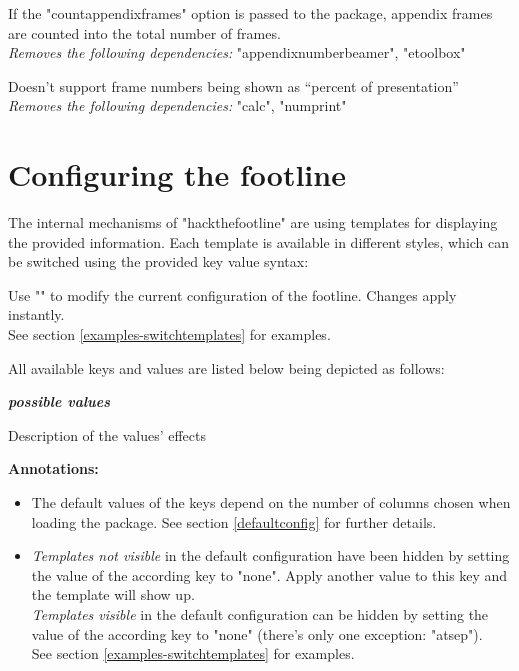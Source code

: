 \documentclass[11pt]{ltxdoc}
\newcommand{\DescribeOption}[3]{
  \DescribeMacro{#1}
  \begin{minipage}[t]{\textwidth}
    \textit{\textbf{#2}}\dotfill~\par
    \begingroup
    \vspace{0.5em}#3\par
    \endgroup
  \end{minipage}%
  \bigskip\medskip%
}
\begin{document}
	\medskip
	If the "countappendixframes" option is passed to the package, appendix frames are counted into the total number of frames. \\
	\textit{Removes the following dependencies:} "appendixnumberbeamer", "etoolbox"
	
	\medskip
	Doesn't support frame numbers being shown as \enquote{percent of presentation} \\
	\textit{Removes the following dependencies:} "calc", "numprint"



	\section{Configuring the footline}
	The internal mechanisms of "hackthefootline" are using templates for displaying the provided information.
	Each template is available in different styles, which can be switched using the provided key value syntax:
	
	\medskip
	\DescribeMacro{\htfconfig}
	Use "" to modify the current configuration of the footline. Changes apply instantly. \\
	See section \ref{examples-switchtemplates} for examples.
	
	\bigskip
	All available keys and values are listed below being depicted as follows:
	
	\medskip
	\DescribeOption{key}{possible values}{Description of the values' effects}
	
	\medskip
	\textbf{Annotations:}
	\begin{itemize}
		\item
			The default values of the keys depend on the number of columns chosen when loading the package. See section \ref{defaultconfig} for further details.
		\item
			\textit{Templates not visible} in the default configuration have been hidden by setting the value of the according key to "none". Apply another value to this key and the template will show up. \\
			\textit{Templates visible} in the default configuration can be hidden by setting the value of the according key to "none" (there's only one exception: "atsep"). \\
			See section \ref{examples-switchtemplates} for examples.
	\end{itemize}
	
\end{document}
